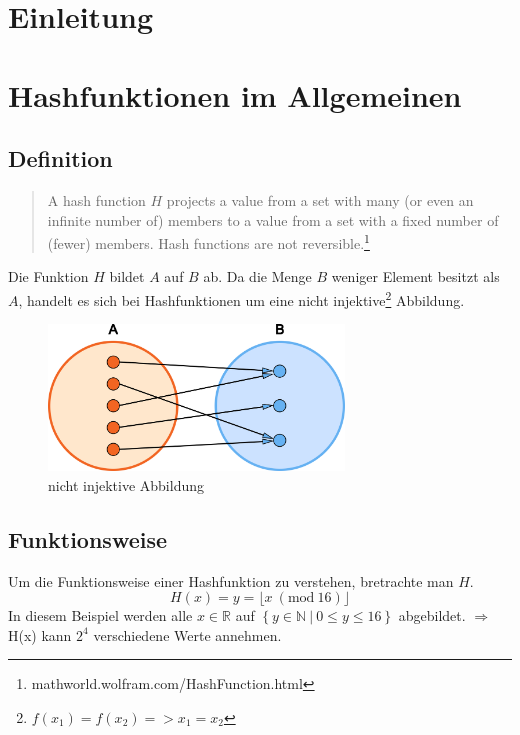 \documentclass[12pt,a4paper]{scrartcl}
\newcommand{\Mod}[1]{\ (\text{mod}\ #1)}
\begin{document}
\newpage
\tableofcontents

\newpage
\section{Einleitung}
\newpage
\section{Hashfunktionen im Allgemeinen}
\subsection{Definition}
\begin{quote}
A hash function $H$ projects a value from a set with many (or even an infinite number of) members to a value from a set with a fixed number of (fewer) members. Hash functions are not reversible.\footnote{mathworld.wolfram.com/HashFunction.html}
\end{quote}

\noindent
Die Funktion $H$ bildet $A$ auf $B$ ab. Da die Menge $B$ weniger Element besitzt als $A$, handelt es sich bei Hashfunktionen um eine nicht injektive\footnote{$ f(x_1) = f(x_2) => x_1 = x_2$} Abbildung. %
	
\begin{figure}[!h]
	\vspace{0.5cm}
	\centering
	\includegraphics[width=0.7\textwidth]{nicht-injektive-abbildung}
	\caption[Caption for LOF]{nicht injektive Abbildung\footnotemark}
	\label{fig:nicht-injektive-abbildung}
\end{figure}
	
\newpage
\subsection{Funktionsweise}
	
Um die Funktionsweise einer Hashfunktion zu verstehen, bretrachte man $H$.
\[ H(x)=y=\lfloor x \Mod{16} \rfloor \]
In diesem Beispiel werden alle $x\in \mathbb{R}$ auf $ \left\lbrace y \in \mathbb{N} \: | \: 0 \leq y \leq 16 \right\rbrace $ abgebildet. 	$\Rightarrow$	H(x) kann $2^4$ verschiedene Werte annehmen.
	
\end{document}
